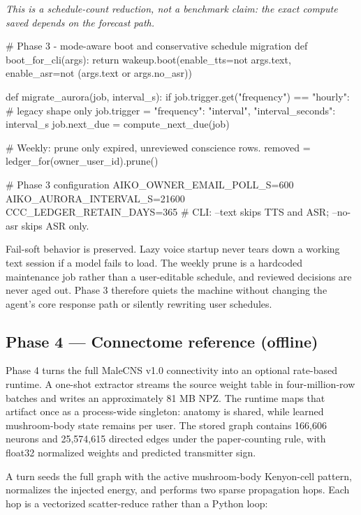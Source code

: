 \documentclass[11pt]{article}
\begin{document}
\noindent\emph{This is a schedule-count reduction, not a benchmark claim: the exact compute saved depends on the forecast path.}

\begin{CodeBlock}
# Phase 3 - mode-aware boot and conservative schedule migration
def boot_for_cli(args):
    return wakeup.boot(enable_tts=not args.text,
                       enable_asr=not (args.text or args.no_asr))

def migrate_aurora(job, interval_s):
    if job.trigger.get("frequency") == "hourly":  # legacy shape only
        job.trigger = {"frequency": "interval",
                       "interval_seconds": interval_s}
        job.next_due = compute_next_due(job)

# Weekly: prune only expired, unreviewed conscience rows.
removed = ledger_for(owner_user_id).prune()
\end{CodeBlock}

\begin{CodeBlock}
# Phase 3 configuration
AIKO_OWNER_EMAIL_POLL_S=600
AIKO_AURORA_INTERVAL_S=21600
CCC_LEDGER_RETAIN_DAYS=365
# CLI: --text skips TTS and ASR; --no-asr skips ASR only.
\end{CodeBlock}

Fail-soft behavior is preserved. Lazy voice startup never tears down a working text session if a model fails to load. The weekly prune is a hardcoded maintenance job rather than a user-editable schedule, and reviewed decisions are never aged out. Phase 3 therefore quiets the machine without changing the agent's core response path or silently rewriting user schedules.

\subsection{Phase 4 — Connectome reference (offline)}

Phase 4 turns the full MaleCNS v1.0 connectivity into an optional rate-based runtime. A one-shot extractor streams the source weight table in four-million-row batches and writes an approximately 81 MB NPZ. The runtime maps that artifact once as a process-wide singleton: anatomy is shared, while learned mushroom-body state remains per user. The stored graph contains 166,606 neurons and 25,574,615 directed edges under the paper-counting rule, with float32 normalized weights and predicted transmitter sign.

A turn seeds the full graph with the active mushroom-body Kenyon-cell pattern, normalizes the injected energy, and performs two sparse propagation hops. Each hop is a vectorized scatter-reduce rather than a Python loop:
\end{document}
